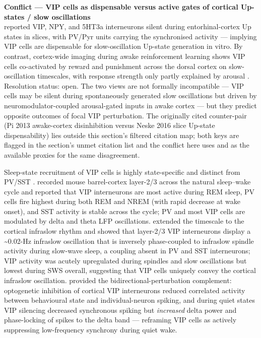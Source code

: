 \documentclass[11pt]{article}
\begin{document}
\begin{framed}
\textbf{Conflict --- VIP cells as dispensable versus active gates of cortical Up-states / slow oscillations}\\
\citet{Tahvildari2012} reported VIP, NPY, and 5HT3a interneurons silent during entorhinal-cortex Up states in slices, with PV/Pyr units carrying the synchronised activity --- implying VIP cells are dispensable for slow-oscillation Up-state generation in vitro. By contrast, cortex-wide imaging during awake reinforcement learning shows VIP cells co-activated by reward and punishment across the dorsal cortex on slow-oscillation timescales, with response strength only partly explained by arousal \citep{Szadai2022}. Resolution status: open. The two views are not formally incompatible --- VIP cells may be silent during spontaneously generated slow oscillations but driven by neuromodulator-coupled arousal-gated inputs in awake cortex --- but they predict opposite outcomes of focal VIP perturbation. The originally cited counter-pair (Pi 2013 awake-cortex disinhibition versus Neske 2016 slice Up-state dispensability) lies outside this section's filtered citation map; both keys are flagged in the section's unmet citation list and the conflict here uses \citet{Tahvildari2012} and \citet{Szadai2022} as the available proxies for the same disagreement.
\end{framed}

Sleep-state recruitment of VIP cells is highly state-specific and distinct from PV/SST \citep{Brecier2022, Rolle2025, Munoz2017}. \citet{Brecier2022} recorded mouse barrel-cortex layer-2/3 across the natural sleep--wake cycle and reported that VIP interneurons are most active during REM sleep, PV cells fire highest during both REM and NREM (with rapid decrease at wake onset), and SST activity is stable across the cycle; PV and most VIP cells are modulated by delta and theta LFP oscillations. \citet{Rolle2025} extended the timescale to the cortical infraslow rhythm and showed that layer-2/3 VIP interneurons display a {\textasciitilde}0.02-Hz infraslow oscillation that is inversely phase-coupled to infraslow spindle activity during slow-wave sleep, a coupling absent in PV and SST interneurons; VIP activity was acutely upregulated during spindles and slow oscillations but lowest during SWS overall, suggesting that VIP cells uniquely convey the cortical infraslow oscillation. \citet{Sabri2024} provided the bidirectional-perturbation complement: optogenetic inhibition of cortical VIP interneurons reduced correlated activity between behavioural state and individual-neuron spiking, and during quiet states VIP silencing decreased synchronous spiking but \textit{increased} delta power and phase-locking of spikes to the delta band --- reframing VIP cells as actively suppressing low-frequency synchrony during quiet wake.
\end{document}
